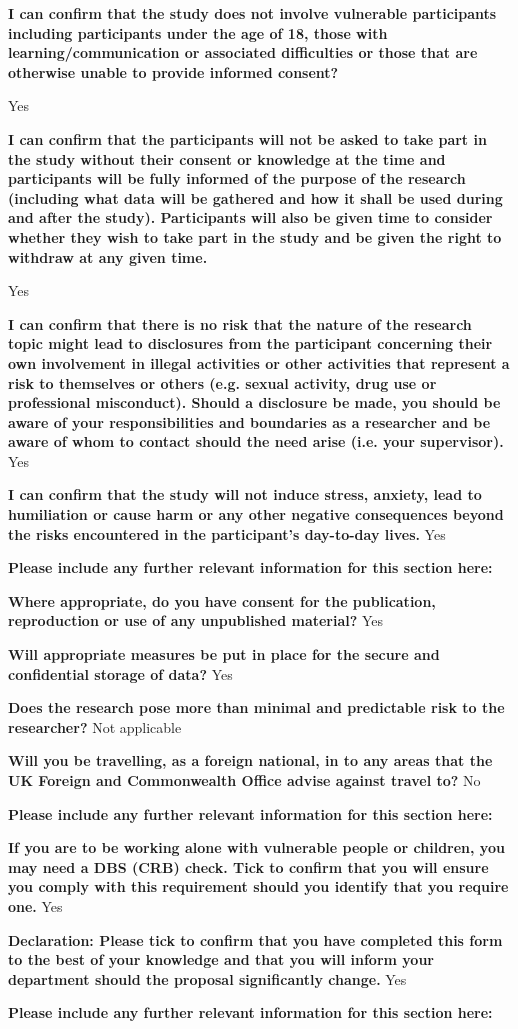 \textbf{I can confirm that the study does not involve vulnerable participants including participants under the age of 18, those with learning/communication or associated difficulties or those that are otherwise unable to provide informed consent?}

Yes

\textbf{I can confirm that the participants will not be asked to take part in the study without their consent or knowledge at the time and participants will be fully informed of the purpose of the research (including what data will be gathered and how it shall be used during and after the study). Participants will also be given time to consider whether they wish to take part in the study and be given the right to withdraw at any given time.}

Yes

\textbf{I can confirm that there is no risk that the nature of the research topic might lead to disclosures from the participant concerning their own involvement in illegal activities or other activities that represent a risk to themselves or others (e.g. sexual activity, drug use or professional misconduct). Should a disclosure be made, you should be aware of your responsibilities and boundaries as a researcher and be aware of whom to contact should the need arise (i.e. your supervisor).} Yes

\textbf{I can confirm that the study will not induce stress, anxiety, lead to humiliation or cause harm or any other negative consequences beyond the risks encountered in the participant’s day-to-day lives.}
Yes

\textbf{Please include any further relevant information for this section here:}

\textbf{Where appropriate, do you have consent for the publication, reproduction or use of any unpublished material?}
Yes

\textbf{Will appropriate measures be put in place for the secure and confidential storage of data?}
Yes

\textbf{Does the research pose more than minimal and predictable risk to the researcher?}
Not applicable

\textbf{Will you be travelling, as a foreign national, in to any areas that the UK Foreign and Commonwealth Office advise against travel to?}
No

\textbf{Please include any further relevant information for this section here:}

\textbf{If you are to be working alone with vulnerable people or children, you may need a DBS (CRB) check. Tick to confirm that you will ensure you comply with this requirement should you identify that you require one.}
Yes

\textbf{Declaration: Please tick to confirm that you have completed this form to the best of your knowledge and that you will inform your department should the proposal significantly change.}
Yes

\textbf{Please include any further relevant information for this section here:}
